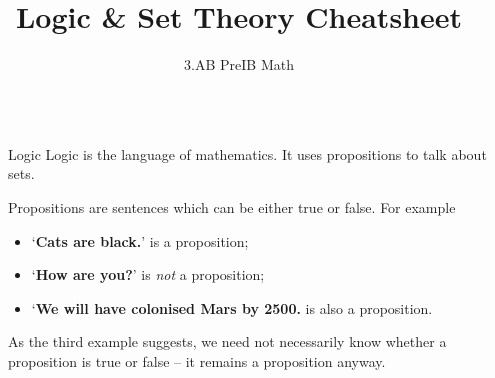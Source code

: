 \documentclass[final]{beamer}
\title{Logic \& Set Theory Cheatsheet}
\author{3.AB PreIB Math}
\institute[shortinst]{Adam Klepáč}
\newlength{\sepwidth}
\newlength{\colwidth}
\newcommand{\separatorcolumn}{\begin{column}{\sepwidth}\end{column}}
\begin{document}

\begin{frame}[t]
\begin{columns}[t]
\separatorcolumn

\begin{column}{\colwidth}

 \begin{block}{Logic}
  \alert{Logic} is the language of mathematics. It uses \alert{propositions} to
  talk about sets.

  Propositions are sentences which can be either true or false. For example
  \begin{itemize}[label=\textbullet,left=24pt]
   \item `\textbf{Cats are black.}' is a proposition;
   \item `\textbf{How are you?}' is \emph{not} a proposition;
   \item `\textbf{We will have colonised Mars by 2500.} is also a proposition.
  \end{itemize}
 \end{block}
 As the third example suggests, we need not necessarily know whether a
 proposition is true or false -- it remains a proposition anyway.

 \vspace{1em}


\end{column}
\end{columns}
\end{frame}
\end{document}

